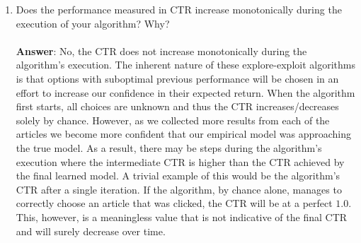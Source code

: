 \documentclass[11pt]{article}
\begin{document}
\begin{enumerate}
\item Does the performance measured in CTR increase monotonically during the
execution of your algorithm? Why? \\ \\
\textbf{Answer}: No, the CTR does not increase monotonically during the
algorithm's execution.  The inherent nature of these explore-exploit algorithms
is that options with suboptimal previous performance will be chosen in an effort
to increase our confidence in their expected return.  When the algorithm first
starts, all choices are unknown and thus the CTR increases/decreases solely by
chance.  However, as we collected more results from each of the articles we
become more confident that our empirical model was approaching the true model. 
As a result, there may be steps during the algorithm's execution where the
intermediate CTR is higher than the CTR achieved by the final learned model.  A
trivial example of this would be the algorithm's CTR after a single iteration. 
If the algorithm, by chance alone, manages to correctly choose an article that
was clicked, the CTR will be at a perfect $1.0$.  This, however, is a
meaningless value that is not indicative of the final CTR and will surely
decrease over time.

\end{enumerate}
\end{document}

